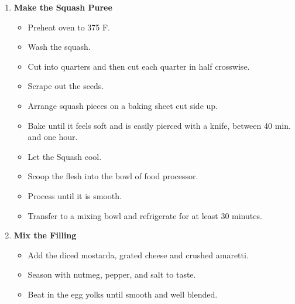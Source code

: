 \documentclass[11pt,letterpaper]{article}
\begin{document}
\begin{description}
\begin{enumerate}
	\item {\bf Make the Squash Puree}
	\begin{itemize}
	\item Preheat oven to 375 F.
	\item Wash the squash.
	\item Cut into quarters and then cut each quarter in half crosswise.
	\item Scrape out the seeds.
	\item Arrange squash pieces on a baking sheet cut side up.
	\item Bake until  it feels soft and is easily pierced with a knife, between 40 min. and one hour. 
	\item Let the Squash cool.
	\item Scoop the flesh into the bowl of food processor. 
	\item Process until it is smooth.
	\item Transfer to a mixing bowl and refrigerate for at least 30 minutes.
	\end{itemize}

	\item {\bf Mix the Filling}
	\begin{itemize}
	\item Add the diced mostarda, grated cheese and crushed amaretti.
	\item Season with nutmeg, pepper, and salt to taste.
	\item Beat in the egg yolks until smooth and well blended.
	\end{itemize}


\end{enumerate}
\end{description}
\end{document}
